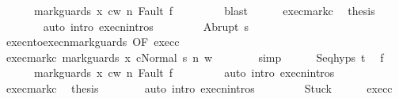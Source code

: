 \begin{isabellebody}
\ \ \ \ \ \ {\isachardoublequoteopen}{\isasymGamma}{\isasymturnstile}{\isasymlangle}mark{\isacharunderscore}guards\ x\ c{}{\isacharcomma}w{\isasymrangle}\ {\isacharequal}n{\isasymRightarrow}\ Fault\ f{\isacharprime}{\isachardoublequoteclose}\ \isanewline
\ \ \ \ \ \ \isamarkupfalse%
\ blast\isanewline
\ \ \ \ \isamarkupfalse%
\ exec{\isacharunderscore}mark{\isacharunderscore}c{}\ \isamarkupfalse%
\ {\isacharquery}thesis\isanewline
\ \ \ \ \ \ \isamarkupfalse%
\ {\isacharparenleft}auto\ intro{\isacharcolon}\ execn{\isachardot}intros{\isacharparenright}\isanewline
\ \ \isamarkupfalse%
\isanewline
\ \ \ \ \isamarkupfalse%
\ {\isacharparenleft}Abrupt\ s{\isacharprime}{\isacharparenright}\isanewline
\ \ \ \ \isamarkupfalse%
\ execn{\isacharunderscore}to{\isacharunderscore}execn{\isacharunderscore}mark{\isacharunderscore}guards\ {\isacharbrackleft}OF\ exec{\isacharunderscore}c{}{\isacharbrackright}\ \isanewline
\ \ \ \ \isamarkupfalse%
\ exec{\isacharunderscore}mark{\isacharunderscore}c{}{\isacharcolon}\ {\isachardoublequoteopen}{\isasymGamma}{\isasymturnstile}{\isasymlangle}mark{\isacharunderscore}guards\ x\ c{}{\isacharcomma}Normal\ s{\isasymrangle}\ {\isacharequal}n{\isasymRightarrow}\ w{\isachardoublequoteclose}\isanewline
\ \ \ \ \ \ \isamarkupfalse%
\ simp\isanewline
\ \ \ \ \isamarkupfalse%
\ Seq{\isachardot}hyps\ t\ \isamarkupfalse%
\ f{\isacharprime}\ \isanewline
\ \ \ \ \ \ {\isachardoublequoteopen}{\isasymGamma}{\isasymturnstile}{\isasymlangle}mark{\isacharunderscore}guards\ x\ c{}{\isacharcomma}w{\isasymrangle}\ {\isacharequal}n{\isasymRightarrow}\ Fault\ f{\isacharprime}{\isachardoublequoteclose}\ \isanewline
\ \ \ \ \ \ \isamarkupfalse%
\ {\isacharparenleft}auto\ intro{\isacharcolon}\ execn{\isachardot}intros{\isacharparenright}\isanewline
\ \ \ \ \isamarkupfalse%
\ exec{\isacharunderscore}mark{\isacharunderscore}c{}\ \isamarkupfalse%
\ {\isacharquery}thesis\isanewline
\ \ \ \ \ \ \isamarkupfalse%
\ {\isacharparenleft}auto\ intro{\isacharcolon}\ execn{\isachardot}intros{\isacharparenright}\isanewline
\ \ \isamarkupfalse%
\isanewline
\ \ \ \ \isamarkupfalse%
\ Stuck\isanewline
\ \ \ \ \isamarkupfalse%
\ exec{\isacharunderscore}c{}\ \isamarkupfalse%

\end{isabellebody}
